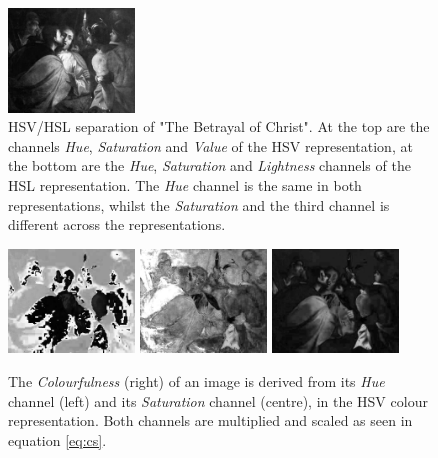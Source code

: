 \documentclass[11pt,a4paper,twoside,openright]{report}
\begin{document}
\begin{figure}[tbp]
\includegraphics[width=0.30\textwidth]{L_caravaggio_1962_139_1}
\caption[HSV/HSL separation]{HSV/HSL separation of "The Betrayal of Christ".
At the top are the channels \emph{Hue}, \emph{Saturation} and \emph{Value} of
the HSV representation, at the bottom are the \emph{Hue}, \emph{Saturation} and
\emph{Lightness} channels of the HSL representation.  The \emph{Hue} channel is
the same in both representations, whilst the \emph{Saturation} and the third
channel is different across the representations.}
\label{fig:hsvl}
\end{figure}

\begin{figure}[tbp]
\centering
\includegraphics[width=0.30\textwidth]{H_caravaggio_1962_139_1}
\includegraphics[width=0.30\textwidth]{SHSV_caravaggio_1962_139_1}
\includegraphics[width=0.30\textwidth]{CS_caravaggio_1962_139_1}
\caption[Colourfulness]{The \emph{Colourfulness} (right) of an image is derived
from its \emph{Hue} channel (left) and its \emph{Saturation} channel (centre),
in the HSV colour representation.  Both channels are multiplied and scaled as
seen in equation \ref{eq:cs}.}
\label{fig:cs}
\end{figure}
\end{document}

